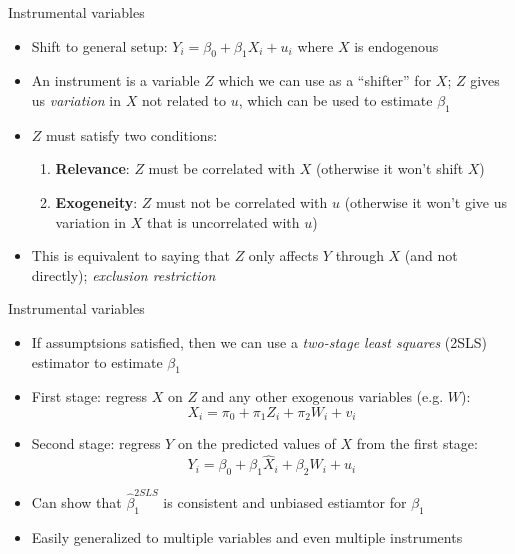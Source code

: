 \documentclass[aspectratio=169]{beamer}
\begin{document}
\begin{frame}{Instrumental variables}
    \begin{itemize}
        \item Shift to general setup: $Y_i = \beta_0 + \beta_1 X_i + u_i$ where $X$ is endogenous
        \item An instrument is a variable $Z$ which we can use as a ``shifter'' for $X$; $Z$ gives us \textit{variation} in $X$ not related to $u$, which can be used to estimate $\beta_1$
        \item $Z$ must satisfy two conditions:
        \begin{enumerate}
            \item \textbf{Relevance}: $Z$ must be correlated with $X$ (otherwise it won't shift $X$)
            \item \textbf{Exogeneity}: $Z$ must not be correlated with $u$ (otherwise it won't give us variation in $X$ that is uncorrelated with $u$)
        \end{enumerate}
        \item This is equivalent to saying that $Z$ only affects $Y$ through $X$ (and not directly); \textit{exclusion restriction}
    \end{itemize}
\end{frame}

\begin{frame}{Instrumental variables}
    \begin{itemize}
        \item If assumptsions satisfied, then we can use a \textit{two-stage least squares} (2SLS) estimator to estimate $\beta_1$
        \item First stage: regress $X$ on $Z$ and any other exogenous variables (e.g. $W$):
        $$X_i = \pi_0 + \pi_1 Z_i + \pi_2 W_i + v_i$$
        \item Second stage: regress $Y$ on the predicted values of $X$ from the first stage:
        $$Y_i = \beta_0 + \beta_1 \hat{X}_i + \beta_2 W_i + u_i$$
        \item Can show that $\hat{\beta}_1^{2SLS}$ is consistent and unbiased estiamtor for $\beta_1$
        \item Easily generalized to multiple variables and even multiple instruments
    \end{itemize}
\end{frame}
\end{document}
